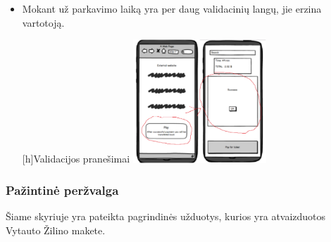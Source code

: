 \documentclass{VUMIFPSkursinis}
\begin{document}
\begin{itemize}
\begin{minipage}{\linewidth}
\end{minipage}
\item Mokant už parkavimo laiką yra per daug validacinių langų, jie erzina vartotoją.\par
\begin{minipage}{\linewidth}
[h]{Validacijos pranešimai}
\centering
\includegraphics[width=5cm]{img/Bad3}
\end{minipage}
\end{itemize}

\subsubsection{Pažintinė peržvalga}
Šiame skyriuje yra pateikta pagrindinės užduotys, kurios yra atvaizduotos Vytauto Žilino makete.
\end{document}
